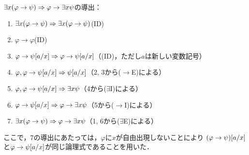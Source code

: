 \(\exists x \paren{\varphi \to \psi} \sequent \varphi \to \exists x \psi\)の導出：
\begin{enumerate}
	\item \(\exists x \paren{\varphi \to \psi} \sequent \exists x \paren{\varphi \to \psi}\)\quad (ID)
	\item \(\varphi \to \varphi\)\quad (ID)
	\item \(\varphi \to \subst{\psi}{a/x} \sequent \varphi \to \subst{\psi}{a/x}\)\quad （(ID)，ただし\(a\)は新しい変数記号）
	\item \(\varphi, \varphi \to \subst{\psi}{a/x} \sequent \subst{\psi}{a/x}\)\quad （2, 3から(\(\to\)E)による）
	\item \(\varphi, \varphi \to \subst{\psi}{a/x} \sequent \exists x \psi\)\quad （4から(\(\exists\)I)による）
	\item \(\varphi \to \subst{\psi}{a/x} \sequent \varphi \to \exists x \psi\)\quad （5から(\(\to\)I)による）
	\item \(\exists x \paren{\varphi \to \psi} \sequent \varphi \to \exists x \psi\)\quad （1, 6から(\(\exists\)E)による）
\end{enumerate}
ここで，7の導出にあたっては，\(\varphi\)に\(x\)が自由出現しないことにより
\(\subst{\paren{\varphi \to \psi}}{a/x}\)と\(\varphi \to \subst{\psi}{a/x}\)が同じ論理式であることを用いた．

